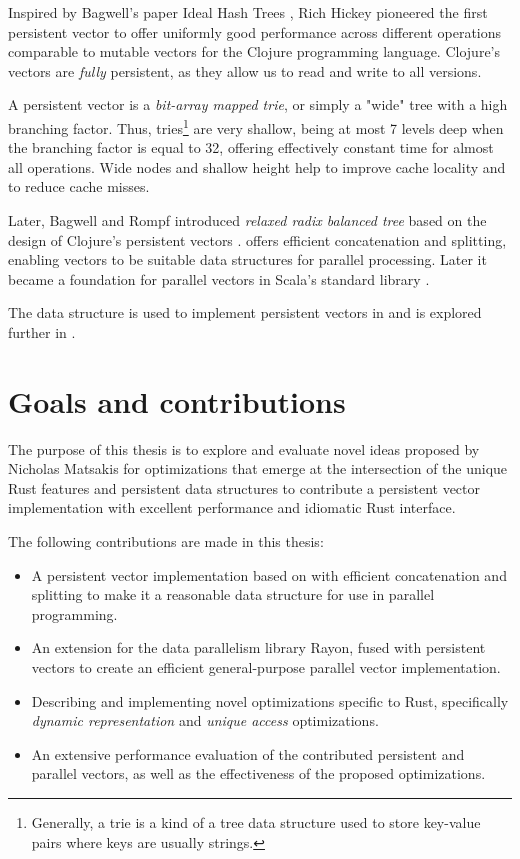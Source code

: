 Inspired by Bagwell's paper Ideal Hash Trees \cite{ideal-hash-trees}, Rich Hickey pioneered the first persistent vector to offer uniformly good performance across different operations comparable to mutable vectors for the Clojure programming language. Clojure's vectors are \emph{fully} persistent, as they allow us to read and write to all versions.

A persistent vector is a \emph{bit-array mapped trie}, or simply a "wide" tree with a high branching factor. Thus, tries\footnote{Generally, a trie is a kind of a tree data structure used to store key-value pairs where keys are usually strings.} are very shallow, being at most 7 levels deep when the branching factor is equal to 32, offering effectively constant time for almost all operations. Wide nodes and shallow height help to improve cache locality and to reduce cache misses.

Later, Bagwell and Rompf introduced \emph{relaxed radix balanced tree} based on the design of Clojure's persistent vectors \cite{efficient-immutable-vectors}. \treerrb{} offers efficient concatenation and splitting, enabling vectors to be suitable data structures for parallel processing. Later it became a foundation for parallel vectors in Scala's standard library \cite{rrb-vector-practical-general-purpose-im-sequence}.

The \treerrb{} data structure is used to implement persistent vectors in \pvecrs{} and is explored further in .

\section{Goals and contributions}
\label{sec:contributions}
The purpose of this thesis is to explore and evaluate novel ideas proposed by Nicholas Matsakis for optimizations that emerge at the intersection of the unique Rust features and persistent data structures to contribute a persistent vector implementation with excellent performance and idiomatic Rust interface.

The following contributions are made in this thesis:
\begin{itemize}
    \item A persistent vector implementation based on \treerrb{} with efficient concatenation and splitting to make it a reasonable data structure for use in parallel programming.
    \item An extension for the data parallelism library Rayon, fused with persistent vectors to create an efficient general-purpose parallel vector implementation.
    \item Describing and implementing novel optimizations specific to Rust, specifically \emph{dynamic representation} and \emph{unique access} optimizations.
    \item An extensive performance evaluation of the contributed persistent and parallel vectors, as well as the effectiveness of the proposed optimizations.
\end{itemize}

